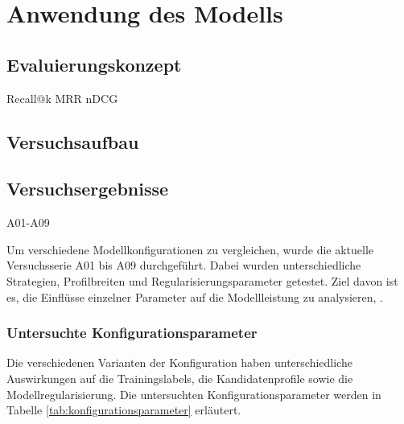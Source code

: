 \chapter{Anwendung des Modells}
\label{chap:anwendung_des_modells}

\section{Evaluierungskonzept}

Recall@k
MRR
nDCG

\section{Versuchsaufbau}

\section{Versuchsergebnisse}

A01-A09

Um verschiedene Modellkonfigurationen zu vergleichen, wurde die aktuelle Versuchsserie A01 bis A09 durchgeführt. 
Dabei wurden unterschiedliche Strategien, Profilbreiten und Regularisierungsparameter getestet. Ziel davon ist es, die Einflüsse einzelner Parameter auf die Modellleistung zu analysieren, \parencite{LTR_Configuration_Test_Series}.

\subsection{Untersuchte Konfigurationsparameter}

Die verschiedenen Varianten der Konfiguration haben unterschiedliche Auswirkungen auf die Trainingslabels, die Kandidatenprofile sowie die Modellregularisierung. 
Die untersuchten Konfigurationsparameter werden in Tabelle \ref{tab:konfigurationsparameter} erläutert.

